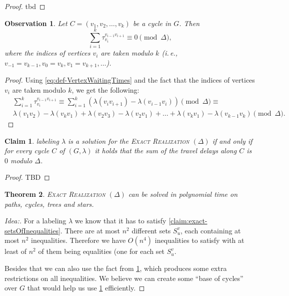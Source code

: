\documentclass[11pt,a4paper]{article}
\newtheorem{theorem}{Theorem}
\newtheorem{observation}{Observation}
\newtheorem{claim}[theorem]{Claim}
\theoremstyle{remark}
\theoremstyle{definition}
\newcommand{\ie}{i.\,e.,\ }
\begin{document}
    \begin{proof}
        tbd
    \end{proof}


\begin{observation} \label{obs:exact-CyclesSum}
    Let $C = (v_1, v_2, \dots, v_k)$ be a cycle in $G$.
    Then 
    \begin{equation*}
        \sum_{i = 1}^k \tau_{v_i}^{v_{i-1}v_{i+1}} \equiv  0 \pmod \Delta,
    \end{equation*}
    where the indices of vertices $v_i$ are taken modulo $k$ (\ie $v_{-1}=v_{k-1}, v_0 = v_k, v_1 = v_{k+1}, \dots$).
    \end{observation}
    
    
    \begin{proof}
        Using \cref{eq:def-VertexWaitingTimes} and the fact that the indices of vertices $v_i$ are taken modulo $k$, we get the following:
        \begin{align*}
            &\sum_{i = 1}^k \tau_{v_i}^{v_{i-1}v_{i+1}}  \equiv  
            \sum_{i = 1}^k  ( \lambda(v_i v_{i+1}) - \lambda (v_{i-1} v_i) ) \pmod \Delta \equiv \\
            &\lambda(v_1 v_2) - \lambda(v_{k}v_1) + \lambda(v_2 v_3) - \lambda(v_2 v_1) + \dots + \lambda(v_k v_1) - \lambda(v_{k-1}v_k) \pmod \Delta.
        \end{align*}
    \end{proof}
    
    \begin{claim}
    labeling $\lambda$ is a solution for the \textsc{Exact Realization $(\Delta)$} if and only if
    for every cycle $C$ of $(G,\lambda)$ it holds that the sum of the travel delays along $C$ is $0$ modulo $\Delta$.
    \end{claim}
    
    \begin{proof}
        TBD
    \end{proof}
    
\begin{theorem}
	\textsc{Exact Realization $(\Delta)$} can be solved in polynomial time on paths, cycles, trees and stars.
\end{theorem}

\begin{proof}[Idea:]
    For a labeling $\lambda$ we know that it has to satisfy \cref{claim:exact-setsOfInequalities}.
    There are at most $n^2$ different sets $S_u^v$, each containing at most $n^2$ inequalities. 
    Therefore we have $O(n^4)$ inequalities to satisfy with at least of $n^2$ of them being equalities (one for each set $S_u^v$. 
    
    Besides that we can also use the fact from \cref{obs:exact-CyclesSum}, which produces some extra restrictions on all inequalities.
    We believe we can create some ``base of cycles'' over $G$ that would help us use \cref{obs:exact-CyclesSum} efficiently.
\end{proof}
\end{document}
